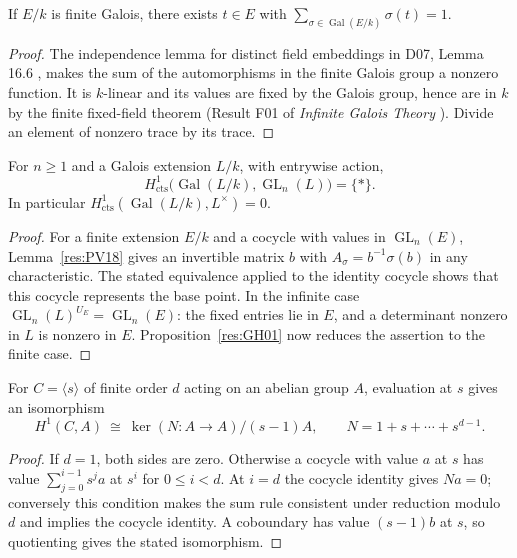 \begin{lemma}
\label{res:GH02}
If \(E/k\) is finite Galois, there exists \(t\in E\) with
\(\sum_{\sigma\in\operatorname{Gal}(E/k)}\sigma(t)=1\).
\end{lemma}
\begin{proof}
The independence lemma for distinct field embeddings in D07,
Lemma 16.6 \cite[PDF p.~125]{mg-d07}, makes the sum of the
automorphisms in the finite Galois group a nonzero function.
It is \(k\)-linear and its values are fixed by the Galois group, hence
are in \(k\) by the finite fixed-field theorem (Result F01 of
\emph{Infinite Galois Theory} \cite[PDF p.~4]{mg-aft}).
Divide an element of nonzero trace by its trace.
\end{proof}

\begin{theorem}
\label{res:GH03}
For \(n\geq 1\) and a Galois extension \(L/k\), with entrywise action,
\[
 H^1_{\mathrm{cts}}\bigl(\operatorname{Gal}(L/k),
                         \operatorname{GL}_n(L)\bigr)=\{*\}.
\]
In particular \(H^1_{\mathrm{cts}}(\operatorname{Gal}(L/k),L^\times)=0\).
\end{theorem}
\begin{proof}
For a finite extension \(E/k\) and a cocycle with values in
\(\operatorname{GL}_n(E)\), Lemma~\ref{res:PV18} gives an invertible
matrix \(b\) with \(A_\sigma=b^{-1}\sigma(b)\) in any characteristic.
The stated equivalence applied to the identity cocycle shows
that this cocycle represents the base point.
In the infinite case \(\operatorname{GL}_n(L)^{U_E}=
\operatorname{GL}_n(E)\): the fixed entries lie in \(E\), and a
determinant nonzero in \(L\) is nonzero in \(E\).
Proposition~\ref{res:GH01} now reduces the assertion to the finite case.
\end{proof}

\begin{proposition}
\label{res:GH04}
For \(C=\langle s\rangle\) of finite order \(d\) acting on an abelian
group \(A\), evaluation at \(s\) gives an isomorphism
\[
 H^1(C,A)\ \cong\ \ker(N:A\to A)/(s-1)A,\qquad
 N=1+s+\cdots+s^{d-1}.
\]
\end{proposition}
\begin{proof}
If \(d=1\), both sides are zero. Otherwise a cocycle with value \(a\)
at \(s\) has value \(\sum_{j=0}^{i-1}s^j a\) at \(s^i\) for
\(0\leq i<d\). At \(i=d\) the cocycle identity gives \(Na=0\);
conversely this condition makes the sum rule consistent under
reduction modulo \(d\) and implies the cocycle identity. A
coboundary has value \((s-1)b\) at \(s\), so quotienting gives
the stated isomorphism.
\end{proof}


